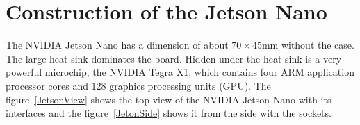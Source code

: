 \section{Construction of the Jetson Nano}


The NVIDIA Jetson Nano has a dimension of about $70 \times 45$mm without the case. The large heat sink dominates the board. Hidden under the heat sink is a very powerful microchip, the NVIDIA Tegra X1, which contains four ARM application processor cores and 128 graphics processing units (GPU). The figure~\ref{JetsonView} shows the top view of the NVIDIA Jetson Nano with its interfaces and the figure~\ref{JetonSide} shows it from the side with the sockets.




	


